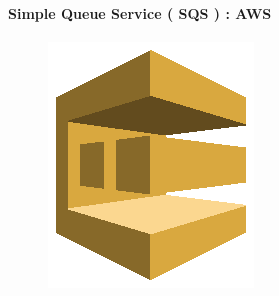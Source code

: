 \documentclass[
12pt,
english,
ngerman,
headsepline,
twoside,
openright,
numbers=noenddot,version=first
]{scrreprt}
\begin{document}
\paragraph{Simple Queue Service ( SQS ) : AWS }
\begin{figure}
	\includegraphics[width=0.9\linewidth]{./pics/aws/Messaging_AmazonSQS.eps}
\end{figure}
\end{document}
